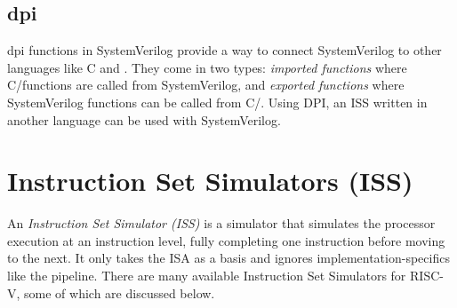 \subsection{\acrfull{dpi}}

\acrfull{dpi} functions in SystemVerilog provide a way to connect SystemVerilog to other languages like C and \cpp \cite{spearSystemVerilogVerificationGuide2012}. They come in two types: \textit{imported functions} where C/\cpp functions are called from  SystemVerilog, and \textit{exported functions} where SystemVerilog functions can be called from C/\cpp. Using DPI, an ISS written in another language can be used with SystemVerilog. 


\section{Instruction Set Simulators (ISS) }
\label{sec:bg_iss}

An \textit{Instruction Set Simulator (ISS)} is a simulator that simulates the processor execution at an instruction level, fully completing one instruction before moving to the next.
It only takes the ISA as a basis and ignores implementation-specifics like the pipeline.
There are many available Instruction Set Simulators for RISC-V, some of which are discussed below.

